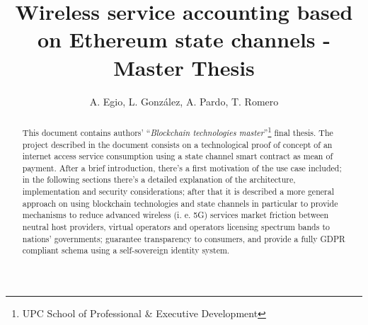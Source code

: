 \documentclass[12pt]{amsart}
\title{Wireless service accounting based on Ethereum state channels
- Master Thesis}
\author{
  A. Egio,
  L. González, A. Pardo, T. Romero
}
\begin{document}
\pagecolor{pagecolor}


\begin{abstract}
  \begin{center}
    This document contains authors' ``\textit{Blockchain
      technologies master}''\footnote{UPC School
      of Professional \& Executive Development}
    final thesis. The project described in the document
    consists on a technological proof
    of concept of an internet access service consumption
    using a state channel smart contract as
    mean of payment. After a brief
    introduction, there's a first motivation of
    the use case included;
    in the following sections
    there's a detailed explanation of
    the architecture, implementation and
    security considerations;
    after that it is described a more
    general approach on using blockchain technologies
    and state channels in particular to provide
    mechanisms to reduce advanced wireless
    (i. e. 5G) services market friction between neutral host
    providers, virtual operators and operators
    licensing spectrum bands to nations' governments;
    guarantee transparency to consumers,
    and provide a fully GDPR compliant
    schema using a self-sovereign identity system.
  \end{center}
\end{abstract}

\maketitle

\tableofcontents

\newpage
\end{document}
